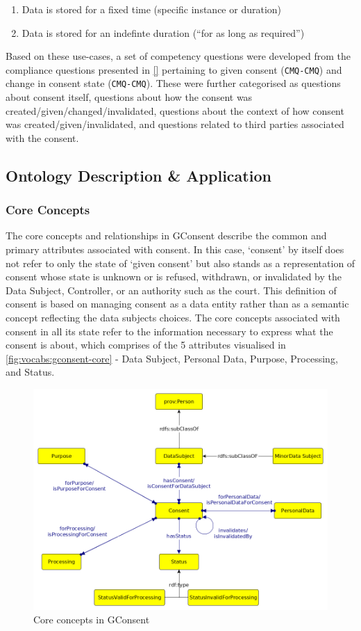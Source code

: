 \begin{enumerate}
  \begin{enumerate}
  \item
    Data is stored for a fixed time (specific instance or duration)
  \item
    Data is stored for an indefinte duration (``for as long as
    required'')
  \end{enumerate}
\end{enumerate}
Based on these use-cases, a set of competency questions were developed from the compliance questions presented in \autoref{} pertaining to given consent (\texttt{CMQ-CMQ}) and change in consent state (\texttt{CMQ-CMQ}).
These were further categorised as questions about consent itself, questions about how the consent was created/given/changed/invalidated, questions about the context of how consent was created/given/invalidated, and questions related to third parties associated with the consent.

\subsection{Ontology Description \& Application}
\subsubsection{Core Concepts}
The core concepts and relationships in GConsent describe the common and primary attributes associated with consent.
In this case, `consent' by itself does not refer to only the state of `given consent' but also stands as a representation of consent whose state is unknown or is refused, withdrawn, or invalidated by the Data Subject, Controller, or an authority such as the court. This definition of consent is based on managing consent as a data entity rather than as a semantic concept reflecting the data subjects choices. 
The core concepts associated with consent in all its state refer to the information necessary to express what the consent is about, which comprises of the 5 attributes visualised in \autoref{fig:vocabs:gconsent-core} - Data Subject, Personal Data, Purpose, Processing, and Status.
\begin{figure}[htbp]
    \centering
    \includegraphics[width=0.8\linewidth]{img/gconsent_core.png}
    \caption{Core concepts in GConsent \cite{}}
    \label{fig:vocabs:gconsent-core}
\end{figure}

